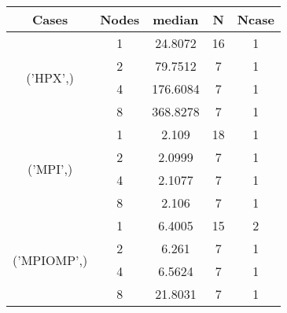 \begin{tabular}{ccccc}
\hline
Cases & Nodes& median & N & Ncase \\
\hline
\multirow{4}{*}{('HPX',)}& 1& 24.8072& 16& 1\\
& 2& 79.7512& 7& 1\\
& 4& 176.6084& 7& 1\\
& 8& 368.8278& 7& 1\\
\hline
\multirow{4}{*}{('MPI',)}& 1& 2.109& 18& 1\\
& 2& 2.0999& 7& 1\\
& 4& 2.1077& 7& 1\\
& 8& 2.106& 7& 1\\
\hline
\multirow{4}{*}{('MPIOMP',)}& 1& 6.4005& 15& 2\\
& 2& 6.261& 7& 1\\
& 4& 6.5624& 7& 1\\
& 8& 21.8031& 7& 1\\
\hline
\end{tabular}



